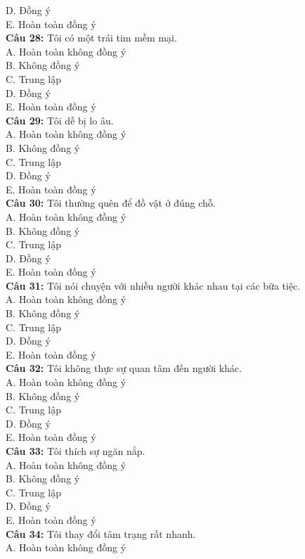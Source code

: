 \begin{multicols}{2}
D. Đồng ý \\
E. Hoàn toàn đồng ý \\
\textbf{Câu 28:} Tôi có một trái tim mềm mại. \\
A. Hoàn toàn không đồng ý \\
B. Không đồng ý \\
C. Trung lập \\
D. Đồng ý \\
E. Hoàn toàn đồng ý \\
\textbf{Câu 29:} Tôi dễ bị lo âu. \\
A. Hoàn toàn không đồng ý \\
B. Không đồng ý \\
C. Trung lập \\
D. Đồng ý \\
E. Hoàn toàn đồng ý \\
\textbf{Câu 30:} Tôi thường quên để đồ vật ở đúng chỗ. \\
A. Hoàn toàn không đồng ý \\
B. Không đồng ý \\
C. Trung lập \\
D. Đồng ý \\
E. Hoàn toàn đồng ý \\
\textbf{Câu 31:} Tôi nói chuyện với nhiều người khác nhau tại các bữa tiệc. \\
A. Hoàn toàn không đồng ý \\
B. Không đồng ý \\
C. Trung lập \\
D. Đồng ý \\
E. Hoàn toàn đồng ý \\
\textbf{Câu 32:} Tôi không thực sự quan tâm đến người khác. \\
A. Hoàn toàn không đồng ý \\
B. Không đồng ý \\
C. Trung lập \\
D. Đồng ý \\
E. Hoàn toàn đồng ý \\
\textbf{Câu 33:} Tôi thích sự ngăn nắp. \\
A. Hoàn toàn không đồng ý \\
B. Không đồng ý \\
C. Trung lập \\
D. Đồng ý \\
E. Hoàn toàn đồng ý \\
\textbf{Câu 34:} Tôi thay đổi tâm trạng rất nhanh. \\
A. Hoàn toàn không đồng ý \\

\end{multicols}
